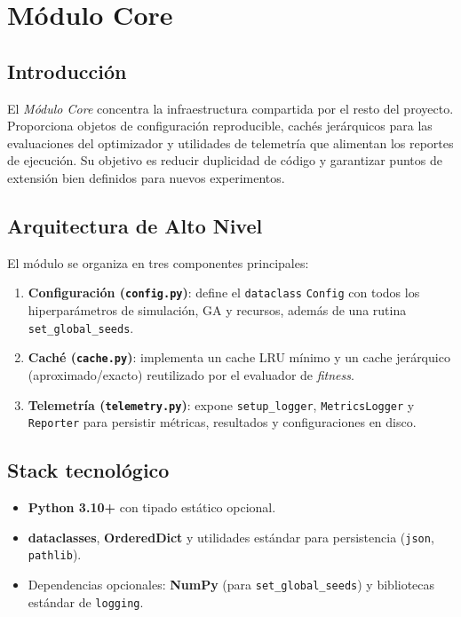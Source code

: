 
\section{Módulo Core}%
\label{sec:modulo-core}

\subsection{Introducción}
El \emph{Módulo Core} concentra la infraestructura compartida por el resto del proyecto. Proporciona objetos de configuración reproducible, cachés jerárquicos para las evaluaciones del optimizador y utilidades de telemetría que alimentan los reportes de ejecución. Su objetivo es reducir duplicidad de código y garantizar puntos de extensión bien definidos para nuevos experimentos.

\subsection{Arquitectura de Alto Nivel}
El módulo se organiza en tres componentes principales:
\begin{enumerate}
    \item \textbf{Configuración (\texttt{config.py})}: define el \texttt{dataclass} \texttt{Config} con todos los hiperparámetros de simulación, GA y recursos, además de una rutina \texttt{set\_global\_seeds}.
    \item \textbf{Caché (\texttt{cache.py})}: implementa un cache LRU mínimo y un cache jerárquico (aproximado/exacto) reutilizado por el evaluador de \emph{fitness}.
    \item \textbf{Telemetría (\texttt{telemetry.py})}: expone \texttt{setup\_logger}, \texttt{MetricsLogger} y \texttt{Reporter} para persistir métricas, resultados y configuraciones en disco.
\end{enumerate}

\subsection{Stack tecnológico}
\begin{itemize}
    \item \textbf{Python 3.10+} con tipado estático opcional.
    \item \textbf{dataclasses}, \textbf{OrderedDict} y utilidades estándar para persistencia (\texttt{json}, \texttt{pathlib}).
    \item Dependencias opcionales: \textbf{NumPy} (para \texttt{set\_global\_seeds}) y bibliotecas estándar de \texttt{logging}.
\end{itemize}

